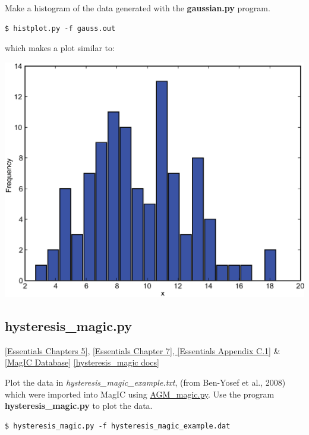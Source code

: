 \documentclass[11pt]{book}
\begin{document}
{{Make a histogram of the data generated with the {\bf gaussian.py} program.



\begin{verbatim}
$ histplot.py -f gauss.out
\end{verbatim}

\noindent  which makes a plot similar to:

  \includegraphics[width=15cm]{EPSfiles/hist.eps}

\subsection{hysteresis\_magic.py}
\href{http://earthref.org/MAGIC/books/Tauxe/Essentials/WebBook3ch5.html#ch5}{[Essentials Chapters 5]}, \href{http://earthref.org/MAGIC/books/Tauxe/Essentials/WebBook3ch7.html#ch7}{[Essentials Chapter 7], }  \href{http://earthref.org/MAGIC/books/Tauxe/Essentials/WebBook3ap3.html#hysteresis_parameters}{[Essentials Appendix C.1]} \& \href{#MagICDatabase}{[MagIC Database]}
\href{https://github.com/PmagPy/PmagPy/blob/master/programs/hysteresis_magic.py}{[hysteresis\_magic docs]}

Plot the data in {\it hysteresis\_magic\_example.txt}, (from  Ben-Yosef et al., 2008) \nocite{benyosef08} which were imported into MagIC using  \href{#AGM_magic.py}{AGM\_magic.py}.   Use the program  {\bf hysteresis\_magic.py} to plot the data.

\begin{verbatim}
$ hysteresis_magic.py -f hysteresis_magic_example.dat


\end{verbatim}}}
\end{document}
